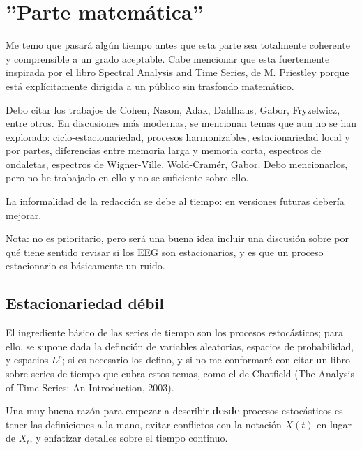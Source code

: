 \chapter{''Parte matem\'atica''}

Me temo que pasar\'a alg\'un tiempo antes que esta parte sea totalmente coherente
y comprensible a un grado aceptable. Cabe mencionar
que esta fuertemente inspirada por el libro Spectral Analysis and Time Series, 
de M. Priestley \cite{Priestley81} porque est\'a expl\'icitamente dirigida a un p\'ublico 
sin trasfondo matem\'atico.

Debo citar los trabajos de Cohen, Nason, Adak, Dahlhaus, Gabor, Fryzelwicz, entre otros.
En discusiones m\'as modernas, se mencionan temas que aun no se han explorado:
ciclo-estacionariedad, procesos harmonizables, estacionariedad local y por partes,
diferencias entre memoria larga y memoria corta, espectros de ondaletas, espectros de
Wigner-Ville, Wold-Cram\'er, Gabor. 
Debo mencionarlos, pero no he trabajado en ello y no se suficiente sobre ello.

La informalidad de la redacci\'on se debe al tiempo: en versiones futuras deber\'ia mejorar.

Nota: no es prioritario, pero ser\'a una buena idea incluir una discusi\'on sobre por qu\'e
tiene sentido revisar si los EEG son estacionarios, y es que un proceso estacionario es 
b\'asicamente un ruido.


\section{Estacionariedad d\'ebil}

El ingrediente b\'asico de las series de tiempo son los procesos estoc\'asticos; para ello, se
supone dada la definci\'on de variables aleatorias, espacios de probabilidad, y espacios $L^{p}$;
si es necesario los defino, y si no me conformar\'e con citar un libro sobre series de tiempo
que cubra estos temas,
como el de Chatfield (The Analysis of Time Series: An Introduction, 2003).

Una muy buena raz\'on para empezar a describir \textbf{desde} procesos estoc\'asticos es tener
las definiciones a la mano, evitar conflictos con la notaci\'on $X(t)$ en lugar de $X_t$, y
enfatizar detalles sobre el tiempo continuo.

